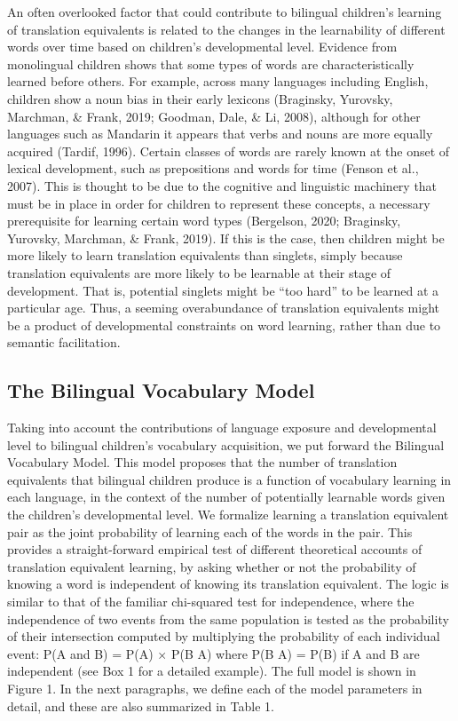 \documentclass[
  english,
  ,man,floatsintext]{apa6}
\begin{document}
An often overlooked factor that could contribute to bilingual children's learning of translation equivalents is related to the changes in the learnability of different words over time based on children's developmental level. Evidence from monolingual children shows that some types of words are characteristically learned before others. For example, across many languages including English, children show a noun bias in their early lexicons (Braginsky, Yurovsky, Marchman, \& Frank, 2019; Goodman, Dale, \& Li, 2008), although for other languages such as Mandarin it appears that verbs and nouns are more equally acquired (Tardif, 1996). Certain classes of words are rarely known at the onset of lexical development, such as prepositions and words for time (Fenson et al., 2007). This is thought to be due to the cognitive and linguistic machinery that must be in place in order for children to represent these concepts, a necessary prerequisite for learning certain word types (Bergelson, 2020; Braginsky, Yurovsky, Marchman, \& Frank, 2019). If this is the case, then children might be more likely to learn translation equivalents than singlets, simply because translation equivalents are more likely to be learnable at their stage of development. That is, potential singlets might be ``too hard'' to be learned at a particular age. Thus, a seeming overabundance of translation equivalents might be a product of developmental constraints on word learning, rather than due to semantic facilitation.

\hypertarget{the-bilingual-vocabulary-model}{%
\subsection{The Bilingual Vocabulary Model}\label{the-bilingual-vocabulary-model}}

Taking into account the contributions of language exposure and developmental level to bilingual children's vocabulary acquisition, we put forward the Bilingual Vocabulary Model. This model proposes that the number of translation equivalents that bilingual children produce is a function of vocabulary learning in each language, in the context of the number of potentially learnable words given the children's developmental level. We formalize learning a translation equivalent pair as the joint probability of learning each of the words in the pair. This provides a straight-forward empirical test of different theoretical accounts of translation equivalent learning, by asking whether or not the probability of knowing a word is independent of knowing its translation equivalent. The logic is similar to that of the familiar chi-squared test for independence, where the independence of two events from the same population is tested as the probability of their intersection computed by multiplying the probability of each individual event: P(A and B) = P(A) × P(B \textbar{} A) where P(B \textbar{} A) = P(B) if A and B are independent (see Box 1 for a detailed example). The full model is shown in Figure 1. In the next paragraphs, we define each of the model parameters in detail, and these are also summarized in Table 1.
\end{document}
